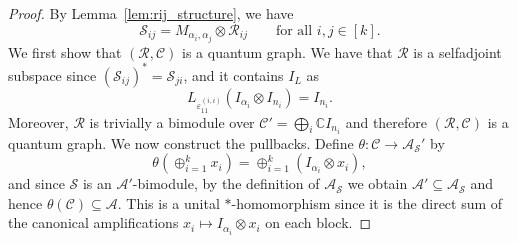 \documentclass[11pt]{amsart}
\numberwithin{equation}{section}
\theoremstyle{plain}
\theoremstyle{definition}
\theoremstyle{remark}
\newcommand{\A}{{\mathcal{A}}}
\newcommand{\C}{{\mathcal{C}}}
\newcommand{\R}{{\mathcal{R}}}
\renewcommand{\S}{{\mathcal{S}}}
\newcommand{\eps}{\varepsilon}
\begin{document}
\begin{proof}
By Lemma~\ref{lem:rij_structure}, we have
\[
\S_{ij}=M_{\alpha_i,\alpha_j}\otimes \R_{ij}
\qquad \text{for all } i,j\in [k].
\]
We first show that $(\R,\C)$ is a quantum graph. 
We have that $\R$ is a selfadjoint subspace since $(\S_{ij})^*=\S_{ji}$, and it
contains $I_L$ as 
\[
L_{\eps_{11}^{(i,i)}}(I_{\alpha_i}\otimes I_{n_i})=I_{n_i}.
\]
Moreover, $\R$ is trivially a bimodule over $\C'=\bigoplus_i\mathbb C I_{n_i}$ and therefore
$(\R,\C)$ is a quantum graph. We now construct the pullbacks. Define $\theta \colon \C \to \A_{\S}'$ by
\[
\theta (\oplus_{i=1}^k x_i)
=
\oplus_{i=1}^k (I_{\alpha_i}\otimes x_i),
\]
and since $\S$ is an $\A'$-bimodule, by the definition of $\A_\S$ we obtain $ \A'\subseteq \A_{\S}$ and hence $\theta(\C)\subseteq \A$.
This is a unital $*$-homomorphism since it is the direct sum of the canonical
amplifications $x_i\mapsto I_{\alpha_i}\otimes x_i$ on each block. 


\end{proof}
\end{document}
